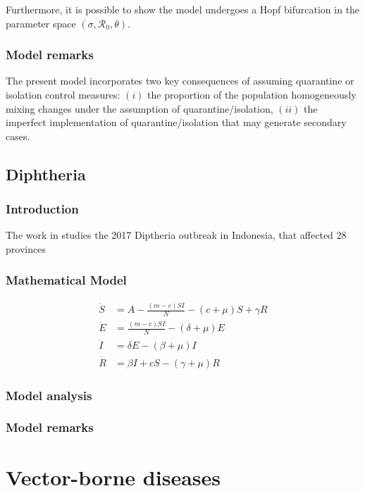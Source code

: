 \documentclass{book}\usepackage[]{graphicx}\usepackage[]{color}
\begin{document}
Furthermore, it is possible to show the model undergoes a Hopf bifurcation in the parameter space $(\sigma,\mathcal{R}_0,\theta)$.

\subsection*{Model remarks}
The present model incorporates two key consequences of assuming quarantine or isolation control measures: $(i)$ the proportion of the population homogeneously mixing changes under the assumption of quarantine/isolation, $(ii)$ the imperfect implementation of quarantine/isolation that may generate secondary cases.


\section{Diphtheria}

\subsection*{Introduction}
The work in \cite{ilahi2018effectiveness} studies the 2017 Diptheria outbreak in Indonesia, that affected 28 provinces

\subsection*{Mathematical Model}

\begin{align}
\dot{S}&=A-\frac{(m-c) S I}{N}-(c+\mu) S+\gamma R \\
\dot{E}&=\frac{(m-c) S I}{N}-(\delta+\mu) E \\
\dot{I}&=\delta E-(\beta+\mu) I \\
\dot{R}&=\beta I+c S-(\gamma+\mu) R
\end{align}

\subsection*{Model analysis}
\subsection*{Model remarks}


\chapter{Vector-borne diseases}
\label{chapt:vectorborne}
\end{document}
